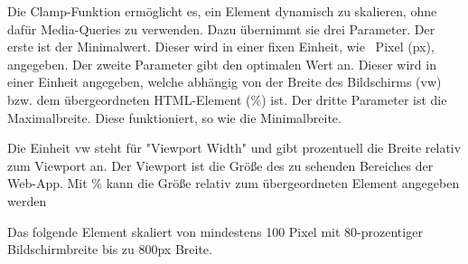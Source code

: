 \label{sec:clamp}

Die Clamp-Funktion ermöglicht es, ein Element dynamisch zu skalieren, ohne dafür Media-Queries zu verwenden. Dazu übernimmt sie drei Parameter. Der erste ist der Minimalwert. Dieser wird in einer fixen Einheit, wie \zb\ Pixel (px), angegeben. Der zweite Parameter gibt den optimalen Wert an. Dieser wird in einer Einheit angegeben, welche abhängig von der Breite des Bildschirms (vw) bzw. dem übergeordneten HTML-Element (\%) ist. Der dritte Parameter ist die Maximalbreite. Diese funktioniert, so wie die Minimalbreite. 

Die Einheit vw steht für "Viewport Width" und gibt prozentuell die Breite relativ zum Viewport an. Der Viewport ist die Größe des zu sehenden Bereiches der Web-App. Mit \% kann die Größe relativ zum übergeordneten Element angegeben werden

Das folgende Element skaliert von mindestens 100 Pixel mit 80-prozentiger Bildschirmbreite bis zu 800px Breite.

